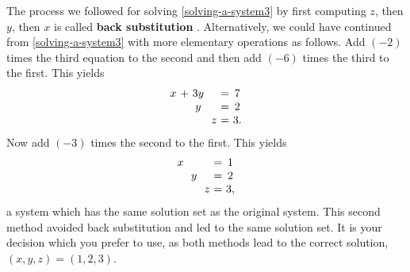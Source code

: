 \begin{solution}
  The process we followed for solving \eqref{solving-a-system3} by
  first computing $z$, then $y$, then $x$ is called \textbf{back
    substitution}%
  .  Alternatively, we could have continued
  from \eqref{solving-a-system3} with more elementary operations as
  follows. Add $(-2)$ times the third equation to the second and then
  add $(-6)$ times the third to the first. This yields
  \begin{equation*}
    \allowbreak
    \begin{array}{c@{~}c@{~}c@{~}c@{~}c@{~}c@{~}c}
      x&+&3y&&&=&7 \\
       &&y&&&=&2 \\
       &&&&z&=&3.
    \end{array}
  \end{equation*}
  Now add $(-3)$ times the second to the first. This yields
  \begin{equation*}
    \allowbreak
    \begin{array}{c@{~}c@{~}c@{~}c@{~}c@{~}c@{~}c}
      x&&&&&=&1 \\
       &&y&&&=&2 \\
       &&&&z&=&3,
    \end{array}
  \end{equation*}
  a system which has the same solution set as the original
  system. This second method avoided back substitution and led to the
  same solution set. It is your decision which you prefer to use, as
  both methods lead to the correct solution,
  $(x,y,z) = (1,2,3)$.
\end{solution}

